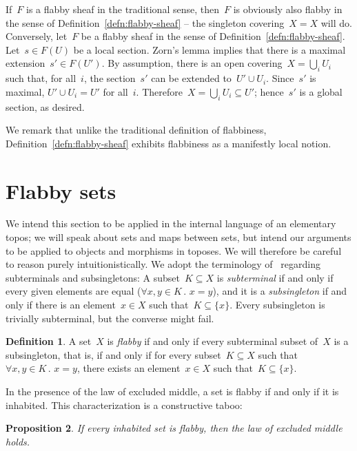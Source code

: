 \documentclass[oneside]{amsart}
\theoremstyle{definition}
\newtheorem{defn}{Definition}[section]
\theoremstyle{plain}
\newtheorem{prop}[defn]{Proposition}
\theoremstyle{remark}
\renewcommand{\_}{\mathpunct{.}\,}
\begin{document}
If~$F$ is a flabby sheaf in the traditional sense, then~$F$ is obviously also
flabby in the sense of Definition~\ref{defn:flabby-sheaf} -- the singleton
covering~$X = X$ will do. Conversely, let~$F$ be a flabby sheaf in the sense of
Definition~\ref{defn:flabby-sheaf}. Let~$s \in F(U)$ be a local section. Zorn's
lemma implies that there is a maximal extension~$s' \in F(U')$. By assumption,
there is an open covering~$X = \bigcup_i U_i$ such that, for all~$i$, the
section~$s'$ can be extended to~$U' \cup U_i$. Since~$s'$ is maximal, $U' \cup
U_i = U'$ for all~$i$. Therefore~$X = \bigcup_i U_i \subseteq U'$; hence~$s'$ is a
global section, as desired.

We remark that unlike the traditional definition of flabbiness,
Definition~\ref{defn:flabby-sheaf} exhibits flabbiness as a manifestly local
notion.


\section{Flabby sets}\label{sect:flabby-sets}

We intend this section to be applied in the internal language of an elementary
topos; we will speak about sets and maps between sets, but intend our arguments
to be applied to objects and morphisms in toposes. We will therefore be careful
to reason purely intuitionistically. We
adopt the terminology of~\cite{kock:partial-maps} regarding subterminals and
subsingletons: A subset~$K \subseteq X$ is \emph{subterminal} if and only if every given
elements are equal ($\forall x,y \in K\_ x = y$), and it is a
\emph{subsingleton} if and only if there is an element~$x \in X$ such that~$K
\subseteq \{ x \}$. Every subsingleton is trivially subterminal, but the converse
might fail.

\begin{defn}\label{defn:flabby-set}A set~$X$ is \emph{flabby} if and only if every subterminal subset
of~$X$ is a subsingleton, that is, if and only if for every subset~$K \subseteq
X$ such that~$\forall x,y \in K\_ x = y$, there exists an element~$x \in X$
such that~$K \subseteq \{ x \}$.
\end{defn}

In the presence of the law of excluded middle, a set is flabby if and only if
it is inhabited. This characterization is a constructive taboo:

\begin{prop}\label{prop:taboo}
If every inhabited set is flabby, then the law of excluded middle
holds.
\end{prop}
\end{document}
